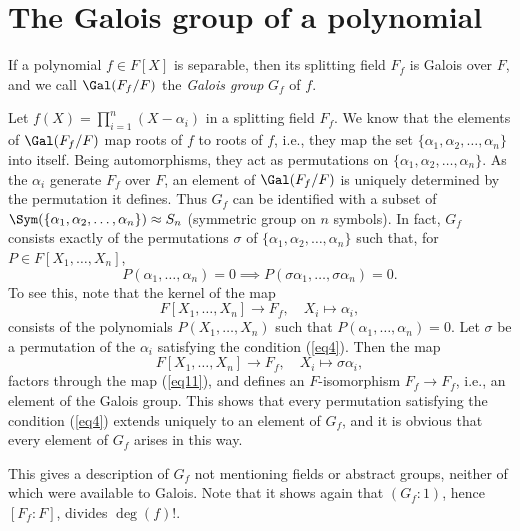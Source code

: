 \documentclass[a4paper,11pt,final,openany]{memoir}
\theoremstyle{nonumberplain}
\begin{document}
\section{The Galois group of a polynomial}

\label{ggp}

If a polynomial $f\in F[X]$ is separable, then its splitting field $F_{f}$ is
Galois over $F$, and we call $\Gal(F_{f}/F)$ the \emph{Galois group}%
$G_{f}$ of $f.$

Let $f(X)=\prod_{i=1}^{n}(X-\alpha_{i})$ in a splitting field $F_{f}$. We know
that the elements of $\Gal(F_{f}/F)$ map roots of $f$ to roots of $f$, i.e.,
they map the set $\{\alpha_{1},\alpha_{2},\ldots,\alpha_{n}\}$ into itself.
Being automorphisms, they act as permutations on $\{\alpha_{1},\alpha
_{2},\ldots,\alpha_{n}\}$. As the $\alpha_{i}$ generate $F_{f}$ over $F$, an
element of $\Gal(F_{f}/F)$ is uniquely determined by the permutation it
defines. Thus $G_{f}$ can be identified with a subset of $\Sym(\{\alpha
_{1},\alpha_{2},\ldots,\alpha_{n}\})\approx S_{n}$
%
(symmetric group on $n$ symbols). In fact, $G_{f}$ consists exactly of the
permutations $\sigma$ of $\{\alpha_{1},\alpha_{2},\ldots,\alpha_{n}\}$ such
that, for $P\in F[X_{1},\ldots,X_{n}]$,%
\begin{equation}
P(\alpha_{1},\ldots,\alpha_{n})=0\implies P(\sigma\alpha_{1},\ldots
,\sigma\alpha_{n})=0. \label{eq4}%
\end{equation}
To see this, note that the kernel of the map%
\begin{equation}
F[X_{1},\ldots,X_{n}]\rightarrow F_{f},\quad X_{i}\mapsto\alpha_{i},
\label{eq11}%
\end{equation}
consists of the polynomials $P(X_{1},\ldots,X_{n})$ such that $P(\alpha
_{1},\ldots,\alpha_{n})=0$. Let $\sigma$ be a permutation of the $\alpha_{i}$
satisfying the condition (\ref{eq4}). Then the map%
\[
F[X_{1},\ldots,X_{n}]\rightarrow F_{f},\quad X_{i}\mapsto\sigma\alpha_{i},
\]
factors through the map (\ref{eq11}), and defines an $F$-isomorphism
$F_{f}\rightarrow F_{f}$, i.e., an element of the Galois group. This shows
that every permutation satisfying the condition (\ref{eq4}) extends uniquely
to an element of $G_{f}$, and it is obvious that every element of $G_{f}$
arises in this way.

This gives a description of $G_{f}$ not mentioning fields or abstract groups,
neither of which were available to Galois. Note that it shows again that
$(G_{f}\colon1)$, hence $[F_{f}\colon F]$, divides $\deg(f)!.$
\end{document}
